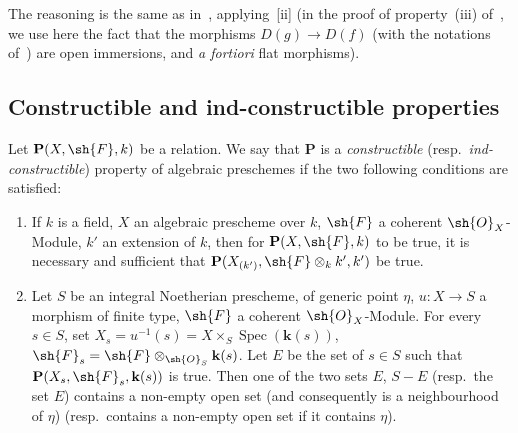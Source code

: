 The reasoning is the same as in~, applying~[ii] (in the proof of property~(iii) of~, we use here the fact that the morphisms $D(g)\to D(f)$ (with the notations of~) are open immersions, and \emph{a fortiori} flat morphisms).

\subsection{Constructible and ind-constructible properties}
\label{subsection:IV.9.2}
\label{IV.9.2}

\begin{definition}[9.2.1]
\label{IV.9.2.1}
Let $\mathbf{P}(X,\sh{F},k)$ be a relation.
We say that $\mathbf{P}$ is a \emph{constructible} (resp.\ \emph{ind-constructible}) property of algebraic preschemes if the two following conditions are satisfied:
\begin{enumerate}[label=(\roman*)]
  \item If $k$ is a field, $X$ an algebraic prescheme over $k$, $\sh{F}$ a coherent $\sh{O}_X$-Module, $k'$ an extension of $k$, then for $\mathbf{P}(X,\sh{F},k)$ to be true, it is necessary and sufficient that $\mathbf{P}(X_{(k')},\sh{F}\otimes_k k',k')$ be true.
  \item Let $S$ be an integral Noetherian prescheme, of generic point $\eta$, $u:X\to S$ a morphism of finite type, $\sh{F}$ a coherent $\sh{O}_X$-Module.
For every $s\in S$, set $X_s=u^{-1}(s)=X\times_S\operatorname{Spec}(\mathbf{k}(s))$, $\sh{F}_s=\sh{F}\otimes_{\sh{O}_S}\mathbf{k}(s)$.
Let $E$ be the set of $s\in S$ such that $\mathbf{P}(X_s,\sh{F}_s,\mathbf{k}(s))$ is true.
Then one of the two sets $E$, $S-E$ (resp.\ the set $E$) contains a non-empty open set (and consequently is a neighbourhood of $\eta$) (resp.\ contains a non-empty open set if it contains $\eta$).
\end{enumerate}
\end{definition}


